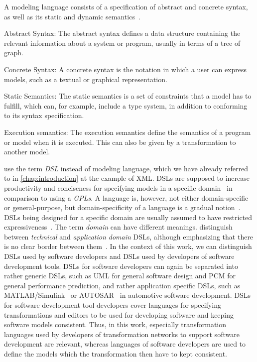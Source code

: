 A modeling language consists of a specification of abstract and concrete syntax, as well as its static and dynamic semantics~\cite[p. 26]{voelter2013DslEngineering}.
\begin{properdescription}
    \item[Abstract Syntax:] The abstract syntax defines a data structure containing the relevant information about a system or program, usually in terms of a tree of graph.
    \item[Concrete Syntax:] A concrete syntax is the notation in which a user can express models, such as a textual or graphical representation.
    \item[Static Semantics:] The static semantics is a set of constraints that a model has to fulfill, which can, for example, include a type system, in addition to conforming to its syntax specification.
    \item[Execution semantics:] The execution semantics define the semantics of a program or model when it is executed. This can also be given by a transformation to another model.  
\end{properdescription}

\textcite{voelter2013DslEngineering} use the term \emph{\gls{DSL}} instead of modeling language, which we have already referred to in \autoref{chap:introduction} at the example of \gls{XML}.
\Glspl{DSL} are supposed to increase productivity and conciseness for specifying models in a specific domain~\cite[p.~30]{voelter2013DslEngineering} in comparison to using a \emph{\glspl{GPL}}.
A language is, however, not either domain-specific or general-purpose, but domain-specificity of a language is a gradual notion~\cite[p.~30]{voelter2013DslEngineering}.
\Glspl{DSL} being designed for a specific domain are usually assumed to have restricted expressiveness~\cite[Chap.~2]{fowler2010dsls-Book}.
The term \emph{domain} can have different meanings.
\citeauthor{voelter2013DslEngineering} distinguish between \emph{technical} and \emph{application domain} \glspl{DSL}, although emphasizing that there is no clear border between them~\cite[p.~26]{voelter2013DslEngineering}.
In the context of this work, we can distinguish \glspl{DSL} used by software developers and \glspl{DSL} used by developers of software development tools.
\glspl{DSL} for software developers can again be separated into rather generic \glspl{DSL}, such as \gls{UML} for general software design and \gls{PCM} for general performance prediction, and rather application specific \glspl{DSL}, such as MATLAB/Simulink~\cite{simulink} or AUTOSAR~\cite{scheid2015autosar} in automotive software development.
\glspl{DSL} for software development tool developers cover languages for specifying transformations and editors to be used for developing software and keeping software models consistent.
Thus, in this work, especially transformation languages used by developers of transformation networks to support software development are relevant, whereas languages of software developers are used to define the models which the transformation then have to kept consistent.


